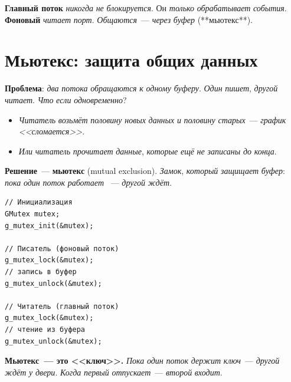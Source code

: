 \begin{keybox}
\textbf{Главный поток} \emph{никогда} \emph{не} \emph{блокируется}.
Он \emph{только} \emph{обрабатывает} \emph{события}.
\textbf{Фоновый} \emph{читает} \emph{порт}. \emph{Общаются}~---
\emph{через} \emph{буфер} (**мьютекс**).
\end{keybox}

\section{Мьютекс: защита общих данных}
\label{sec:pc-mutex}

\textbf{Проблема}: \emph{два} \emph{потока} \emph{обращаются} \emph{к}
\emph{одному} \emph{буферу}. \emph{Один} \emph{пишет}, \emph{другой}
\emph{читает}. \emph{Что} \emph{если} \emph{одновременно}?

\begin{itemize}
    \item \emph{Читатель} \emph{возьмёт} \emph{половину} \emph{новых}
          \emph{данных} \emph{и} \emph{половину} \emph{старых}~---
          \emph{график} \emph{<<сломается>>}.
    \item \emph{Или} \emph{читатель} \emph{прочитает} \emph{данные},
          \emph{которые} \emph{ещё} \emph{не} \emph{записаны}
          \emph{до} \emph{конца}.
\end{itemize}

\textbf{Решение}~--- \textbf{мьютекс} (mutual exclusion).
\emph{Замок}, \emph{который} \emph{защищает} \emph{буфер}:
\emph{пока} \emph{один} \emph{поток} \emph{работает}~
--- \emph{другой} \emph{ждёт}.

\begin{listing}[htbp]
\begin{verbatim}
// Инициализация
GMutex mutex;
g_mutex_init(&mutex);

// Писатель (фоновый поток)
g_mutex_lock(&mutex);
// запись в буфер
g_mutex_unlock(&mutex);

// Читатель (главный поток)
g_mutex_lock(&mutex);
// чтение из буфера
g_mutex_unlock(&mutex);
\end{verbatim}
\caption{\texttt{GMutex}: защита общих данных}
\label{lst:pc-mutex}
\end{listing}

\begin{ideabox}
\textbf{Мьютекс~--- это <<ключ>>.} \emph{Пока} \emph{один}
\emph{поток} \emph{держит} \emph{ключ}~--- \emph{другой}
\emph{ждёт} \emph{у} \emph{двери}. \emph{Когда} \emph{первый}
\emph{отпускает}~--- \emph{второй} \emph{входит}.
\end{ideabox}

